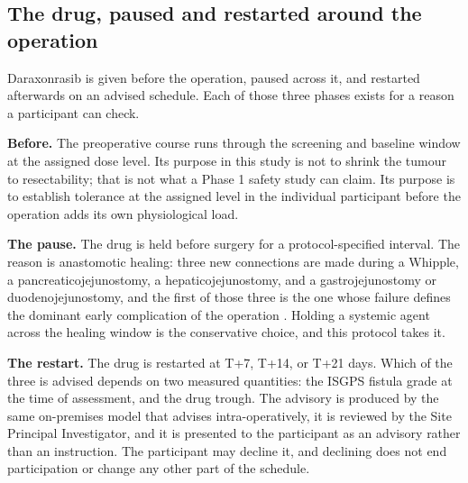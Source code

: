 \subsection{The drug, paused and restarted around the operation}

Daraxonrasib is given before the operation, paused across it, and restarted
afterwards on an advised schedule. Each of those three phases exists for a
reason a participant can check.

\textbf{Before.} The preoperative course runs through the screening and baseline
window at the assigned dose level. Its purpose in this study is not to shrink
the tumour to resectability; that is not what a Phase 1 safety study can claim.
Its purpose is to establish tolerance at the assigned level in the individual
participant before the operation adds its own physiological load.

\textbf{The pause.} The drug is held before surgery for a protocol-specified
interval. The reason is anastomotic healing: three new connections are made
during a Whipple, a pancreaticojejunostomy, a hepaticojejunostomy, and a
gastrojejunostomy or duodenojejunostomy, and the first of those three is the one
whose failure defines the dominant early complication of the operation
\cite{Bassi2017}. Holding a systemic agent across the healing window is the
conservative choice, and this protocol takes it.

\textbf{The restart.} The drug is restarted at T+7, T+14, or T+21 days. Which of
the three is advised depends on two measured quantities: the ISGPS fistula grade
at the time of assessment, and the drug trough. The advisory is produced by the
same on-premises model that advises intra-operatively, it is reviewed by the Site
Principal Investigator, and it is presented to the participant as an advisory
rather than an instruction. The participant may decline it, and declining does
not end participation or change any other part of the schedule.

\vspace{0.30em}

